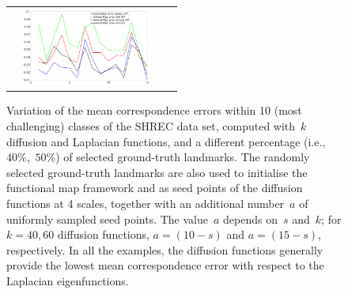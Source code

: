 \documentclass[acmtog,authorversion]{acmart}
\begin{document}
\begin{figure}
\begin{tabular}{cc||cc}
&\includegraphics[width=120pt]{FMAP-images/19-STATISTICS-50.jpg}	%
\end{tabular}
\caption{Variation of the mean correspondence errors within 10 (most challenging) classes of the SHREC data set, computed with~$k$ diffusion and Laplacian functions, and a different percentage (i.e.,~$40\%$,~$50\%$) of selected ground-truth landmarks. The randomly selected ground-truth landmarks are also used to initialise the functional map framework and as seed points of the diffusion functions at 4 scales, together with an additional number~$a$ of uniformly sampled seed points. The value~$a$ depends on~$s$ and~$k$; for \mbox{$k=40, 60$} diffusion functions, \mbox{$a=(10-s)$} and \mbox{$a=(15-s)$}, respectively. In all the examples, the diffusion functions generally provide the lowest mean correspondence error with respect to the Laplacian eigenfunctions.\label{fig:SHREC-STATISTICS}}
\end{figure}
%
\end{document}
